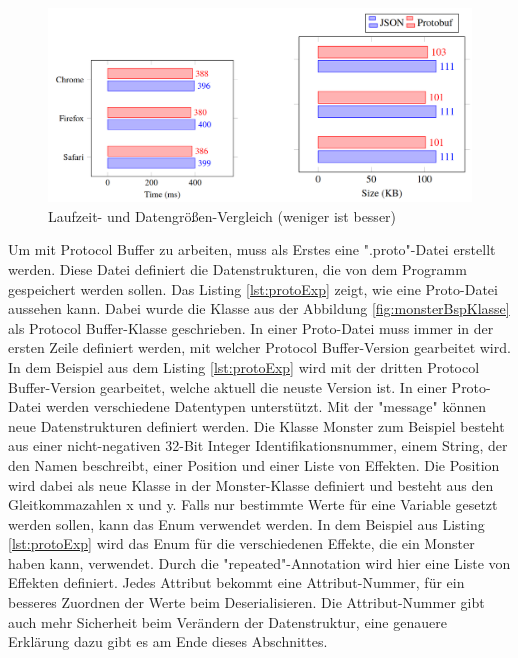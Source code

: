 \begin{figure}[htp]
    \centering
    \includegraphics[width=1\textwidth]{images/protobuf_browser.png}
    \caption{Laufzeit- und Datengrößen-Vergleich (weniger ist besser) \cite{currier2022protocol}}
    \label{fig:protobufBrowser}
\end{figure}

Um mit Protocol Buffer zu arbeiten, muss als Erstes eine ".proto"-Datei erstellt werden. Diese Datei definiert die Datenstrukturen, die von dem Programm gespeichert werden sollen. Das Listing \ref{lst:protoExp} zeigt, wie eine Proto-Datei aussehen kann. Dabei wurde die Klasse aus der Abbildung \ref{fig:monsterBspKlasse} als Protocol Buffer-Klasse geschrieben. In einer Proto-Datei muss immer in der ersten Zeile definiert werden, mit welcher Protocol Buffer-Version gearbeitet wird. In dem Beispiel aus dem Listing \ref{lst:protoExp} wird mit der dritten Protocol Buffer-Version gearbeitet, welche aktuell die neuste Version ist. In einer Proto-Datei werden verschiedene Datentypen unterstützt. Mit der "message" können neue Datenstrukturen definiert werden. Die Klasse Monster zum Beispiel besteht aus einer nicht-negativen 32-Bit Integer Identifikationsnummer, einem String, der den Namen beschreibt, einer Position und einer Liste von Effekten. Die Position wird dabei als neue Klasse in der Monster-Klasse definiert und besteht aus den Gleitkommazahlen x und y. Falls nur bestimmte Werte für eine Variable gesetzt werden sollen, kann das Enum verwendet werden. In dem Beispiel aus Listing \ref{lst:protoExp} wird das Enum für die verschiedenen Effekte, die ein Monster haben kann, verwendet. Durch die "repeated"-Annotation wird hier eine Liste von Effekten definiert. Jedes Attribut bekommt eine Attribut-Nummer, für ein besseres Zuordnen der Werte beim Deserialisieren.\cite{protobufLanguageGuide}\cite{protobufProtocolBufferJava} Die Attribut-Nummer gibt auch mehr Sicherheit beim Verändern der Datenstruktur, eine genauere Erklärung dazu gibt es am Ende dieses Abschnittes. 

